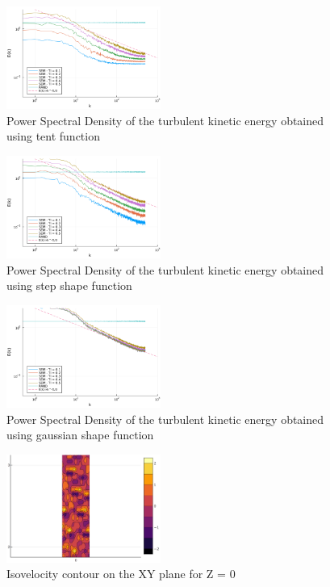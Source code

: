 \documentclass{juliacon}
\begin{document}
\begin{figure}[h]
         \centering
         \includegraphics[width=0.45\textwidth]{Images/PSD/SEM_vs_RAND_tent.png}
         \caption{Power Spectral Density of the turbulent kinetic energy obtained using tent function}          
         \label{figsem:tentpsd}
\end{figure}

\begin{figure}[h]
         \centering
         \includegraphics[width=0.45\textwidth]{Images/PSD/SEM_vs_RAND_step.png}
         \caption{Power Spectral Density of the turbulent kinetic energy obtained using step shape function}
            \label{figsem:steppsd}
\end{figure}


\begin{figure}[h]
         \centering
         \includegraphics[width=0.45\textwidth]{Images/PSD/SEM_vs_RAND_gaus.png}
         \caption{Power Spectral Density of the turbulent kinetic energy obtained using gaussian shape function}
            \label{figsem:gauspsd}
\end{figure}






\begin{figure}[h]
     \centering          
     \includegraphics[width=0.45\textwidth]{Images/Eddy.png}
         \caption{Isovelocity contour on the XY plane for Z = 0}          
         \label{figsem:eddy_z0}
     \end{figure} 
\end{document}
